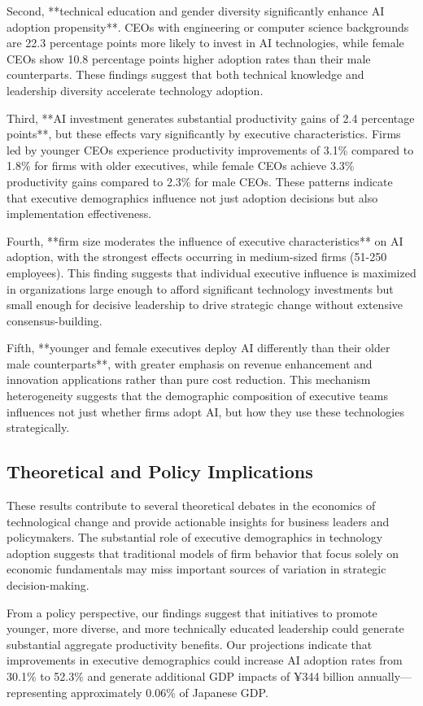 \documentclass[12pt, a4paper]{article}
\begin{document}
Second, **technical education and gender diversity significantly enhance AI adoption propensity**. CEOs with engineering or computer science backgrounds are 22.3 percentage points more likely to invest in AI technologies, while female CEOs show 10.8 percentage points higher adoption rates than their male counterparts. These findings suggest that both technical knowledge and leadership diversity accelerate technology adoption.

Third, **AI investment generates substantial productivity gains of 2.4 percentage points**, but these effects vary significantly by executive characteristics. Firms led by younger CEOs experience productivity improvements of 3.1\% compared to 1.8\% for firms with older executives, while female CEOs achieve 3.3\% productivity gains compared to 2.3\% for male CEOs. These patterns indicate that executive demographics influence not just adoption decisions but also implementation effectiveness.

Fourth, **firm size moderates the influence of executive characteristics** on AI adoption, with the strongest effects occurring in medium-sized firms (51-250 employees). This finding suggests that individual executive influence is maximized in organizations large enough to afford significant technology investments but small enough for decisive leadership to drive strategic change without extensive consensus-building.

Fifth, **younger and female executives deploy AI differently than their older male counterparts**, with greater emphasis on revenue enhancement and innovation applications rather than pure cost reduction. This mechanism heterogeneity suggests that the demographic composition of executive teams influences not just whether firms adopt AI, but how they use these technologies strategically.

\subsection{Theoretical and Policy Implications}

These results contribute to several theoretical debates in the economics of technological change and provide actionable insights for business leaders and policymakers. The substantial role of executive demographics in technology adoption suggests that traditional models of firm behavior that focus solely on economic fundamentals may miss important sources of variation in strategic decision-making.

From a policy perspective, our findings suggest that initiatives to promote younger, more diverse, and more technically educated leadership could generate substantial aggregate productivity benefits. Our projections indicate that improvements in executive demographics could increase AI adoption rates from 30.1\% to 52.3\% and generate additional GDP impacts of ¥344 billion annually—representing approximately 0.06\% of Japanese GDP.
\end{document}
